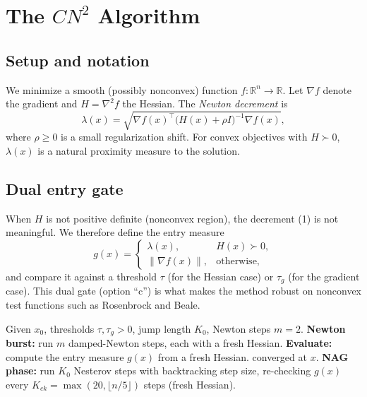 \documentclass[11pt]{article}
\newcommand{\R}{\mathbb{R}}
\newcommand{\lam}{\lambda}
\newcommand{\grad}{\nabla}
\newcommand{\cn}{CN^2}
\begin{document}
\section{The $\cn$ Algorithm}
\label{sec:method}

\subsection{Setup and notation}
We minimize a smooth (possibly nonconvex) function $f:\R^n\to\R$. Let $\grad f$ denote the
gradient and $H=\grad^2 f$ the Hessian. The \emph{Newton decrement} is
\begin{equation}
\label{eq:lambda}
\lam(x)=\sqrt{\grad f(x)^{\top}\big(H(x)+\rho I\big)^{-1}\grad f(x)},
\end{equation}
where $\rho\ge0$ is a small regularization shift. For convex objectives with $H\succ 0$,
$\lam(x)$ is a natural proximity measure to the solution.

\subsection{Dual entry gate}
\label{sec:dual-gate}
When $H$ is not positive definite (nonconvex region), the decrement (1) is not meaningful.
We therefore define the entry measure
\begin{equation}
g(x)=\begin{cases}
\lam(x), & H(x)\succ 0,\\[2mm]
\|\grad f(x)\|, & \text{otherwise},
\end{cases}
\end{equation}
and compare it against a threshold $\tau$ (for the Hessian case) or $\tau_g$ (for the
gradient case). This dual gate (option ``c'') is what makes the method robust on
nonconvex test functions such as Rosenbrock and Beale.

\begin{algorithm}[H]
\caption{$\cn$ (Checkpointed Newton--Nesterov)}
\label{alg:cn2}
\begin{algorithmic}[1]
\State Given $x_0$, thresholds $\tau,\tau_g>0$, jump length $K_0$, Newton steps $m=2$.
\Repeat
  \State \textbf{Newton burst:} run $m$ damped-Newton steps, each with a fresh Hessian.
  \State \textbf{Evaluate:} compute the entry measure $g(x)$ from a fresh Hessian.
    \State \Return converged at $x$.
  \EndIf
  \State \textbf{NAG phase:} run $K_0$ Nesterov steps with backtracking step size,
  re-checking $g(x)$ every $K_{ck}=\max(20,\lfloor n/5\rfloor)$ steps (fresh Hessian).
\end{algorithmic}
\end{algorithm}
\end{document}
